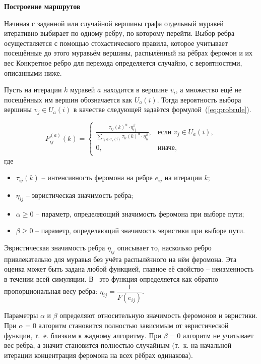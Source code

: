 \textbf{Построение маршрутов}

Начиная с заданной или случайной вершины графа отдельный муравей итеративно выбирает по одному ребру, по которому перейти. Выбор ребра осуществляется с помощью стохастического правила, которое учитывает посещённые до этого муравьём вершины, распылённый на рёбрах феромон и их вес Конкретное ребро для перехода определяется случайно, с вероятностями, описанными ниже.

Пусть на итерации $k$ муравей $a$ находится в вершине $v_i$, а множество ещё не посещённых им вершин обозначается как $U_a(i)$. Тогда вероятность выбора вершины $v_j \in U_a(i)$ в качестве следующей задаётся формулой~(\ref{eq:probrule}).

\begin{equation}
P_{ij}^{(a)}(k) =
\begin{cases}
	\displaystyle \frac{\tau_{ij}(k)^\alpha \cdot \eta_{ij}^\beta}
	{\sum\limits_{v_l \in U_a(i)} \tau_{il}(k)^\alpha \cdot \eta_{il}^\beta}, & \text{если } v_j \in U_a(i), \\
	0, & \text{иначе}, \\
\end{cases}
\label{eq:probrule}
\end{equation}
где
\begin{itemize}
	\item $\tau_{ij}(k)$ -- интенсивность феромона на ребре $e_{ij}$ на итерации $k$;
	\item $\eta_{ij}$ -- эвристическая значимость ребра;
	\item $\alpha \geqslant 0$ -- параметр, определяющий значимость феромона при выборе пути;
	\item $\beta \geqslant 0$ -- параметр, определяющий значимость эвристики при выборе пути.
\end{itemize}

Эвристическая значимость ребра $\eta_{ij}$ описывает то, насколько ребро привлекательно для муравья без учёта распылённого на нём феромона. Эта оценка может быть задана любой функцией, главное её свойство -- неизменность в течении всей симуляции. В~\cite{ant-origin} это функция определяется как обратно пропорциональная весу ребра: $\eta_{ij} = \dfrac{1}{F(e_{ij})}$.

Параметры $\alpha$ и $\beta$ определяют относительную значимость феромонов и эвристики. При $\alpha = 0$ алгоритм становится полностью зависимым от эвристической функции, т.~е. близким к жадному алгоритму. При $\beta = 0$ алгоритм не учитывает вес ребра, а значит становится полностью случайным (т.~к. на начальной итерации концентрация феромона на всех рёбрах одинакова).


